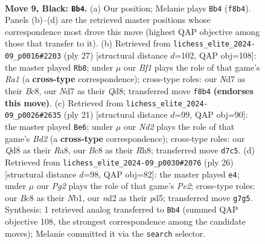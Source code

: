 \documentclass[11pt]{article}
\begin{document}
\clearpage

\begin{figure}[p]\centering
\begin{subfigure}{0.46\textwidth}\centering
\resizebox{\linewidth}{!}{%
\newchessgame
\chessboard[
  setfen={r1bqkb2/pp1n1ppr/2n1p3/3pP3/3P4/5P2/PP1N2PP/R1BQK1NR b KQq - 0 9},
  showmover=false,
  pgfstyle=straightmove, color=movearrow, markmove={f8-b4}
]}
\caption{}
\end{subfigure}\hfill
\begin{subfigure}{0.46\textwidth}\centering
\resizebox{\linewidth}{!}{%
\newchessgame
\chessboard[
  setfen={r1bq1rk1/5pbp/5np1/pNpPp3/4P1P1/7P/PPB1NP2/R2QK2R b KQ - 0 14},
  showmover=false,
  pgfstyle=straightmove, color=movearrow, markmove={a8-b8}
]}
\caption{}
\end{subfigure}
\\[4pt]
\begin{subfigure}{0.46\textwidth}\centering
\resizebox{\linewidth}{!}{%
\newchessgame
\chessboard[
  setfen={r3kb1r/pp1b1ppp/1qn5/3pPp2/3P4/5N1P/PP3PP1/RNBQR1K1 b kq - 0 11},
  showmover=false,
  pgfstyle=straightmove, color=movearrow, markmove={d7-e6}
]}
\caption{}
\end{subfigure}\hfill
\begin{subfigure}{0.46\textwidth}\centering
\resizebox{\linewidth}{!}{%
\newchessgame
\chessboard[
  setfen={rnbqk2r/p4pb1/7p/3pP1p1/2p5/2P3P1/P2NPPP1/RN1QKB1R w KQkq - 0 14},
  showmover=false,
  pgfstyle=straightmove, color=movearrow, markmove={e2-e4}
]}
\caption{}
\end{subfigure}
\caption{\textbf{Move 9, Black: \texttt{Bb4}.} (a) Our position; Melanie plays \texttt{Bb4} (\texttt{f8b4}). Panels (b)--(d) are the retrieved master positions whose correspondence most drove this move (highest QAP objective among those that transfer to it). (b) Retrieved from \texttt{lichess\_elite\_2024-09\_p0016\#2203} (ply 27) [structural distance $d$=102, QAP obj=108]: the master played \texttt{Rb8}; under $\mu$ our \emph{Bf1} plays the role of that game's \emph{Ra1} (a \textbf{cross-type} correspondence); cross-type roles: our \emph{N}d7 as their \emph{B}c8, our \emph{N}d7 as their \emph{Q}d8; transferred move \texttt{f8b4} \textbf{(endorses this move)}. (c) Retrieved from \texttt{lichess\_elite\_2024-09\_p0026\#2635} (ply 21) [structural distance $d$=99, QAP obj=90]: the master played \texttt{Be6}; under $\mu$ our \emph{Nd2} plays the role of that game's \emph{Bd2} (a \textbf{cross-type} correspondence); cross-type roles: our \emph{Q}d8 as their \emph{R}a8, our \emph{B}c8 as their \emph{R}h8; transferred move \texttt{d7c5}. (d) Retrieved from \texttt{lichess\_elite\_2024-09\_p0030\#2076} (ply 26) [structural distance $d$=98, QAP obj=82]: the master played \texttt{e4}; under $\mu$ our \emph{Pg2} plays the role of that game's \emph{Pe2}; cross-type roles: our \emph{B}c8 as their \emph{N}b1, our \emph{n}d2 as their \emph{p}d5; transferred move \texttt{g7g5}. Synthesis: 1 retrieved analog transferred to \texttt{Bb4} (summed QAP objective 108, the strongest correspondence among the candidate moves); Melanie committed it via the \texttt{search} selector.}
\label{fig:thought-m17}
\end{figure}
\end{document}
